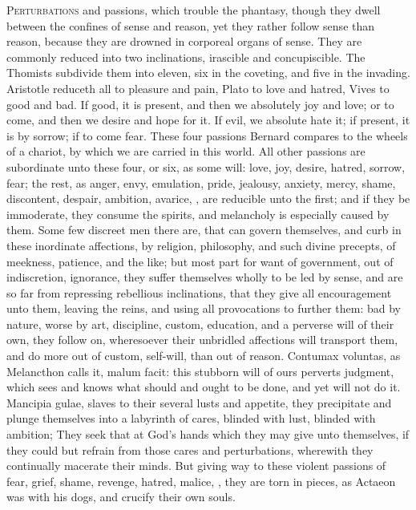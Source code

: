 {\lettrine{P}{erturbations} and passions, which trouble the phantasy, though they
dwell between the confines of sense and reason, yet they rather follow
sense than reason, because they are drowned in corporeal organs of
sense. They are commonly reduced into two inclinations, irascible
and concupiscible. The Thomists subdivide them into eleven, six in the
coveting, and five in the invading. Aristotle reduceth all to pleasure
and pain, Plato to love and hatred, Vives to good and bad. If
good, it is present, and then we absolutely joy and love; or to come,
and then we desire and hope for it. If evil, we absolute hate it; if
present, it is by sorrow; if to come fear. These four passions
Bernard compares to the wheels of a chariot, by which we are
carried in this world. All other passions are subordinate unto these
four, or six, as some will: love, joy, desire, hatred, sorrow, fear;
the rest, as anger, envy, emulation, pride, jealousy, anxiety, mercy,
shame, discontent, despair, ambition, avarice, \etc{}, are reducible unto
the first; and if they be immoderate, they consume the spirits,
and melancholy is especially caused by them. Some few discreet men
there are, that can govern themselves, and curb in these inordinate
affections, by religion, philosophy, and such divine precepts, of
meekness, patience, and the like; but most part for want of government,
out of indiscretion, ignorance, they suffer themselves wholly to be led
by sense, and are so far from repressing rebellious inclinations, that
they give all encouragement unto them, leaving the reins, and using all
provocations to further them: bad by nature, worse by art, discipline,
custom, education, and a perverse will of their own, they follow
on, wheresoever their unbridled affections will transport them, and do
more out of custom, self-will, than out of reason. Contumax voluntas,
as Melancthon calls it, malum facit: this stubborn will of ours
perverts judgment, which sees and knows what should and ought to be
done, and yet will not do it. Mancipia gulae, slaves to their several
lusts and appetite, they precipitate and plunge themselves into a
labyrinth of cares, blinded with lust, blinded with ambition;
They seek that at God's hands which they may give unto
themselves, if they could but refrain from those cares and
perturbations, wherewith they continually macerate their minds. But
giving way to these violent passions of fear, grief, shame, revenge,
hatred, malice, \etc{}, they are torn in pieces, as Actaeon was with his
dogs, and crucify their own souls.

}
